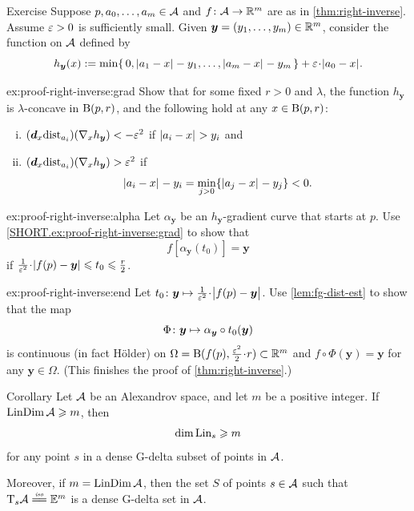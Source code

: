 \begin{thm}[!]{Exercise}\label{ex:proof-right-inverse}
Suppose $p,a_0,\dots,a_m\in\mathcal{A}$ and $f\colon\mathcal{A}\to\mathbb{R}^m$ are as in \ref{thm:right-inverse}.
Assume $\varepsilon>0$ is sufficiently small.
Given $\bm{y}\z=(y_1,\z\dots,y_m)\in \RR^m$,
consider the function on $\mathcal{A}$ defined by
\[h_{\bm{y}}(x)\df\min\{\,0, \dist{a_1}{x}{}-y_1,\dots,\dist{a_m}{x}{}-y_m\,\}+\eps\cdot\dist{a_0}{x}{}.\]


\begin{subthm}{ex:proof-right-inverse:grad}
Show that for some fixed $r>0$ and $\lambda$, the function $h_{\bm{y}}$ is $\lambda$-concave in $\mathrm{B}{}(p,r)$, and the following hold at any $x\in \mathrm{B}{}(p,r)$:
\begin{enumerate}[(i)]
\item\label{111} $(\bm{d}_x\mathrm{dist}_{a_i})(\nabla_x h_{\bm{y}})<-\varepsilon^2$ if $\dist{a_i}{x}{}>y_i$ and
\item\label{222} $(\bm{d}_x\mathrm{dist}_{a_i})(\nabla_x h_{\bm{y}})>\varepsilon^2$ if
\[\dist{a_i}{x}{}-y_i=\min_{j>0}\{\dist{a_j}{x}{}\z-y_j\}<0.\]
\end{enumerate}


\end{subthm}

\begin{subthm}{ex:proof-right-inverse:alpha}
Let $\alpha_{\bm{y}}$ be an $h_{\bm{y}}$-gradient curve that starts at $p$.
Use \ref{SHORT.ex:proof-right-inverse:grad} to show that
\[
f[\alpha_{\bm{y}}(t_0)]
=
\bm{y}\]
if
$\tfrac1{\eps^2}\cdot|f(p)-\bm{y}|
\le
t_0
\le
\tfrac{r}{2}$.

\end{subthm}

\begin{subthm}{ex:proof-right-inverse:end}
Let $t_0\:\bm{y}\mapsto\tfrac{1}{\eps^2}\cdot\bigl|f(p)-\bm{y}\bigr|$.
Use \ref{lem:fg-dist-est} to show that the map
\[\Phi\colon{\bm{y}}\mapsto \alpha_{\bm{y}}\circ t_0(\bm{y})\]
is continuous (in fact Hölder) on $\Omega=\oBall(f(p),\tfrac{\eps^2}{2}\cdot r)\subset\RR^m$
and $f\circ \Phi(\bm{y})=\bm{y}$ for any $\bm{y}\in \Omega$.
(This finishes the proof of \ref{thm:right-inverse}.)
\end{subthm}

\end{thm}

\begin{thm}{Corollary}\label{cor:tan-g-delta}
Let $\mathcal{A}$ be an Alexandrov space, and let $m$ be a positive integer.
If $\mathop{\rm LinDim}\nolimits\mathcal{A}\geqslant m$, then
\[\dim\Lin_s\z\ge m\]
for any point $s$ in a dense G-delta subset of points in $\mathcal{A}$.

Moreover, if $m=\mathop{\rm LinDim}\nolimits\mathcal{A}$, then the set $S$ of points $s\in \mathcal{A}$ such that $\T_s\spc{A}\iso \EE^m$ is a dense G-delta set in $\mathcal{A}$.
\end{thm}

